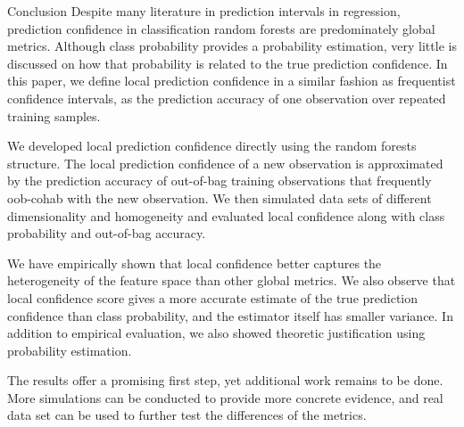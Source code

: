 \documentclass[12pt]{pom_thesis}
\begin{document}
\begin{chapter}{Conclusion}
Despite many literature in prediction intervals in regression, prediction confidence in classification random forests are predominately global metrics. Although class probability provides a probability estimation, very little is discussed on how that probability is related to the true prediction confidence. In this paper, we define local prediction confidence in a similar fashion as frequentist confidence intervals, as the prediction accuracy of one observation over repeated training samples. 

We developed local prediction confidence directly using the random forests structure. The local prediction confidence of a new observation is approximated by the prediction accuracy of out-of-bag training observations that frequently oob-cohab with the new observation. We then simulated data sets of different dimensionality and homogeneity and evaluated local confidence along with class probability and out-of-bag accuracy. 

We have empirically shown that local confidence better captures the heterogeneity of the feature space than other global metrics. We also observe that local confidence score gives a more accurate estimate of the true prediction confidence than class probability, and the estimator itself has smaller variance. In addition to empirical evaluation, we also showed theoretic justification using probability estimation.

The results offer a promising first step, yet additional work remains to be done. More simulations can be conducted to provide more concrete evidence, and real data set can be used to further test the differences of the metrics. 
\end{chapter}
\end{document}
